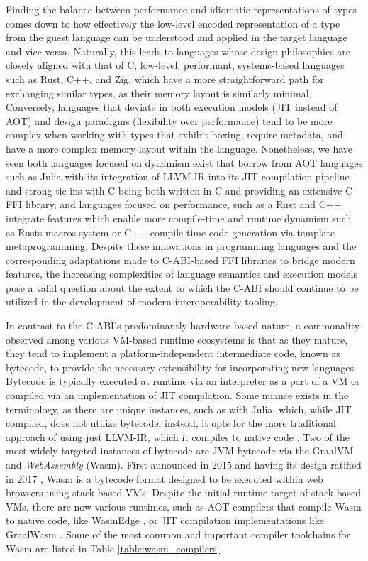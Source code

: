 Finding the balance between performance and idiomatic representations of types comes down to how effectively the low-level encoded representation of a type from the guest language can be understood and applied in the target language and vice versa. Naturally, this leads to languages whose design philosophies are closely aligned with that of C, \ie low-level, performant, systems-based languages such as Rust, C++, and Zig, which have a more straightforward path for exchanging similar types, as their memory layout is similarly minimal. Conversely, languages that deviate in both execution models (JIT instead of AOT) and design paradigms (flexibility over performance) tend to be more complex when working with types that exhibit boxing, require metadata, and have a more complex memory layout within the language. Nonetheless, we have seen both languages focused on dynamism exist that borrow from AOT languages such as Julia with its integration of LLVM-IR into its JIT compilation pipeline and strong tie-ins with C being both written in C and providing an extensive C-FFI library, and languages focused on performance, such as a Rust and C++ integrate features which enable more compile-time and runtime dynamism such as Rusts macros system or C++ compile-time code generation via template metaprogramming. Despite these innovations in programming languages and the corresponding adaptations made to C-ABI-based FFI libraries to bridge modern features, the increasing complexities of language semantics and execution models pose a valid question about the extent to which the C-ABI should continue to be utilized in the development of modern interoperability tooling.   

In contrast to the C-ABI's predominantly hardware-based nature, a commonality observed among various VM-based runtime ecosystems is that as they mature, they tend to implement a platform-independent intermediate code, known as bytecode, to provide the necessary extensibility for incorporating new languages. Bytecode is typically executed at runtime via an interpreter as a part of a VM or compiled via an implementation of JIT compilation. Some nuance exists in the terminology, as there are unique instances, such as with Julia, which, while JIT compiled, does not utilize bytecode; instead, it opts for the more traditional approach of using just LLVM-IR, which it compiles to native code \cite{juliaJITdocs}. Two of the most widely targeted instances of bytecode are JVM-bytecode via the GraalVM \cite{graalvmLanguagesManual} and \textit{WebAssembly} (Wasm). First announced in 2015 and having its design ratified in 2017 \cite{webassemblyFeatures}, Wasm is a bytecode format designed to be executed within web browsers using stack-based VMs. Despite the initial runtime target of stack-based VMs, there are now various runtimes, such as AOT compilers that compile Wasm to native code, like WasmEdge \cite{wasmedgeAOT}, or JIT compilation implementations like GraalWasm \cite{graalvmWebAssembly}. Some of the most common and important compiler toolchains for Wasm are listed in Table \ref{table:wasm_compilers}.

